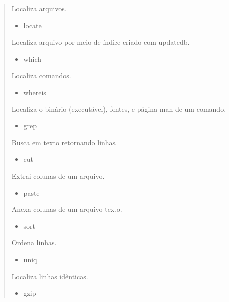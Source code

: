 \documentclass[a4paper,10pt,portuguese]{sphinxmanual}
\begin{document}
\begin{quote}
\begin{description}
\begin{itemize}
\end{itemize}

Localiza arquivos.
\begin{itemize}
\item {} 
locate

\end{itemize}

Localiza arquivo por meio de índice criado com updatedb.
\begin{itemize}
\item {} 
which

\end{itemize}

Localiza comandos.
\begin{itemize}
\item {} 
whereis

\end{itemize}

Localiza o binário (executável), fontes, e página man de
um comando.
\begin{itemize}
\item {} 
grep

\end{itemize}

Busca em texto retornando linhas.
\begin{itemize}
\item {} 
cut

\end{itemize}

Extrai colunas de um arquivo.
\begin{itemize}
\item {} 
paste

\end{itemize}

Anexa colunas de um arquivo texto.
\begin{itemize}
\item {} 
sort

\end{itemize}

Ordena linhas.
\begin{itemize}
\item {} 
uniq

\end{itemize}

Localiza linhas idênticas.
\begin{itemize}
\item {} 
gzip

\end{itemize}


\end{description}
\end{quote}
\end{document}

